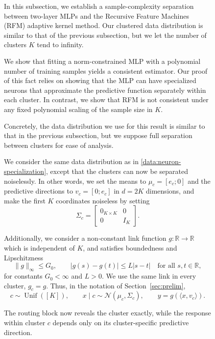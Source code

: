 \documentclass{article}
\newcounter{setting}[section]
\newcounter{datasetting}
\begin{document}
\begin{figure}
In this subsection, we establish a sample-complexity
separation between two-layer MLPs and the Recursive Feature Machines (RFM) adaptive kernel method. Our clustered data distribution is similar to that of the previous subsection, but we let the number of clusters $K$ tend to infinity.


We show that fitting a norm-constrained MLP with a
polynomial number of training samples yields a consistent estimator. Our proof
of this fact relies on showing that the MLP can have specialized neurons that
approximate the predictive function separately within each cluster. In
contrast, we show that RFM is not consistent under any fixed polynomial scaling of
the sample size in $K$.


Concretely, the data distribution we use for this result is similar to that in the previous subsection, but we suppose full separation between clusters for
ease of analysis.

\begingroup
{}
\begin{datasetting}
\label{data:rfm-mlp-gap}
We consider the same data distribution as in \cref{data:neuron-specialization}, except that the clusters can now be separated noiselessly. 
In other words, we set the means to $\mu_c=[e_c;0]$ and the predictive directions to
$v_c=[0;e_c]$ in $d=2K$ dimensions, and make the first $K$ coordinates
noiseless by setting
\[
    \Sigma_c=
    \begin{bmatrix}
        0_{K\times K} & 0\\
        0 & I_K
    \end{bmatrix}.
\]


Additionally, we consider a non-constant link function $g:\mathbb R\to\mathbb R$ which is independent of $K$, and satisfies boundedness and Lipschitzness
\[
    \|g\|_\infty\leq G_0,
    \qquad
    |g(s)-g(t)|\leq L|s-t|
    \quad\text{for all }s,t\in\mathbb R,
\]
for constants $G_0<\infty$ and $L>0$. We use the same link in every
cluster, $g_c=g$. Thus, in the notation of Section~\ref{sec:prelim},
\[
    c\sim\operatorname{Unif}([K]),
    \qquad
    x\mid c\sim\mathcal N(\mu_c,\Sigma_c),
    \qquad
    y=g\!\left(\langle x,v_c\rangle\right).
\]

\end{datasetting}
\endgroup

The routing block now reveals the cluster exactly, while the response within
cluster $c$ depends only on its cluster-specific predictive direction.


\end{figure}
\end{document}
